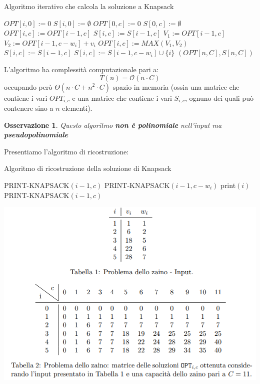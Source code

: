 \documentclass[12pt]{article}
\newtheorem{Osservazione}{Osservazione}[subsection]
\begin{document}
\begin{algorithm}[H]
    \caption{Algoritmo iterativo che calcola la soluzione a Knapsack}
    \DontPrintSemicolon
     {
         {
            $OPT[i, 0] := 0$ \;
            $S[i, 0] := \emptyset$
        }
         {
            $OPT[0, c] := 0$ \;
            $S[0, c] := \emptyset$
        }
         {
             {
                 {
                    $OPT[i,c] := OPT[i-1,c]$ \;
                    $S[i,c] := S[i-1,c]$
                } {
                    $V_1 := OPT[i-1, c]$ \;
                    $V_2 := OPT[i-1, c-w_i] + v_i$ \;
                    $OPT[i,c] := MAX(V_1, V_2)$
                     {
                        $S[i,c] := S[i-1,c]$
                    } {
                        $S[i,c] := S[i-1, c-w_i] \cup \{i\}$
                    }
                }
            }
        }
        \Return $(OPT[n,C], S[n,C])$
    }
\end{algorithm} \noindent
L'algoritmo ha complessità computazionale pari a:
$$T(n) = \mathcal{O}(n \cdot C)$$
occupando però $\Theta(n \cdot C + n^2 \cdot C)$ spazio in memoria (ossia una matrice che contiene i vari $OPT_{i,c}$ e una matrice che contiene i vari $S_{i,c}$, ognuno dei quali può contenere sino a $n$ elementi).
\begin{Osservazione}
    Questo algoritmo \textbf{non è polinomiale} nell'input ma \textbf{pseudopolinomiale}
\end{Osservazione}
Presentiamo l'algoritmo di ricostruzione: \newline
\begin{algorithm}[H]
    \caption{Algoritmo di ricostruzione della soluzione di Knapsack}
    \DontPrintSemicolon
     {
         {
             {
                PRINT-KNAPSACK$(i-1, c)$
            } {
                 {
                    PRINT-KNAPSACK$(i-1, c-w_i)$ \;
                    print$(i)$
                } {
                    PRINT-KNAPSACK$(i-1, c)$
                }
            }
        }
    }
\end{algorithm} \noindent
\begin{center}
    \includegraphics[width = 0.80\linewidth]{Images/16.png}
\end{center}
\end{document}
